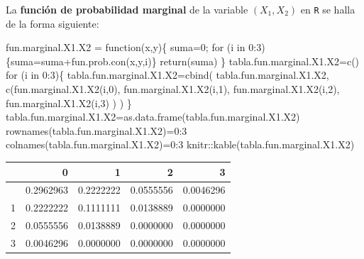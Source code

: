 \documentclass[
  letterpaper,
  DIV=11,
  numbers=noendperiod]{scrreprt}
\newenvironment{Shaded}{\begin{snugshade}}{\end{snugshade}}
\newcommand{\ControlFlowTok}[1]{\textcolor[rgb]{0.00,0.23,0.31}{#1}}
\newcommand{\DecValTok}[1]{\textcolor[rgb]{0.68,0.00,0.00}{#1}}
\newcommand{\FunctionTok}[1]{\textcolor[rgb]{0.28,0.35,0.67}{#1}}
\newcommand{\NormalTok}[1]{\textcolor[rgb]{0.00,0.23,0.31}{#1}}
\newcommand{\OtherTok}[1]{\textcolor[rgb]{0.00,0.23,0.31}{#1}}
\newcommand{\SpecialCharTok}[1]{\textcolor[rgb]{0.37,0.37,0.37}{#1}}
\begin{document}
La \textbf{función de probabilidad marginal} de la variable
\((X_1,X_2)\) en \texttt{R} se halla de la forma siguiente:

\begin{Shaded}
\begin{Highlighting}[]
\NormalTok{fun.marginal.X1.X2 }\OtherTok{=} \ControlFlowTok{function}\NormalTok{(x,y)\{}
\NormalTok{  suma}\OtherTok{=}\DecValTok{0}\NormalTok{;}
  \ControlFlowTok{for}\NormalTok{ (i }\ControlFlowTok{in} \DecValTok{0}\SpecialCharTok{:}\DecValTok{3}\NormalTok{)\{suma}\OtherTok{=}\NormalTok{suma}\SpecialCharTok{+}\FunctionTok{fun.prob.con}\NormalTok{(x,y,i)\}}
  \FunctionTok{return}\NormalTok{(suma)}
\NormalTok{\}}
\NormalTok{tabla.fun.marginal.X1.X2}\OtherTok{=}\FunctionTok{c}\NormalTok{()}
\ControlFlowTok{for}\NormalTok{ (i }\ControlFlowTok{in} \DecValTok{0}\SpecialCharTok{:}\DecValTok{3}\NormalTok{)\{}
\NormalTok{  tabla.fun.marginal.X1.X2}\OtherTok{=}\FunctionTok{cbind}\NormalTok{(}
\NormalTok{    tabla.fun.marginal.X1.X2,}
    \FunctionTok{c}\NormalTok{(}\FunctionTok{fun.marginal.X1.X2}\NormalTok{(i,}\DecValTok{0}\NormalTok{),                                                            }\FunctionTok{fun.marginal.X1.X2}\NormalTok{(i,}\DecValTok{1}\NormalTok{),                                                            }\FunctionTok{fun.marginal.X1.X2}\NormalTok{(i,}\DecValTok{2}\NormalTok{),                                                            }\FunctionTok{fun.marginal.X1.X2}\NormalTok{(i,}\DecValTok{3}\NormalTok{)}
\NormalTok{    )}
\NormalTok{  )}
\NormalTok{  \}}
\NormalTok{tabla.fun.marginal.X1.X2}\OtherTok{=}\FunctionTok{as.data.frame}\NormalTok{(tabla.fun.marginal.X1.X2)}
\FunctionTok{rownames}\NormalTok{(tabla.fun.marginal.X1.X2)}\OtherTok{=}\DecValTok{0}\SpecialCharTok{:}\DecValTok{3}
\FunctionTok{colnames}\NormalTok{(tabla.fun.marginal.X1.X2)}\OtherTok{=}\DecValTok{0}\SpecialCharTok{:}\DecValTok{3}
\NormalTok{knitr}\SpecialCharTok{::}\FunctionTok{kable}\NormalTok{(tabla.fun.marginal.X1.X2)}
\end{Highlighting}
\end{Shaded}

\begin{longtable}[]{@{}lrrrr@{}}
\toprule\noalign{}
& 0 & 1 & 2 & 3 \\
\midrule\noalign{}
\endhead
\bottomrule\noalign{}
\endlastfoot
0 & 0.2962963 & 0.2222222 & 0.0555556 & 0.0046296 \\
1 & 0.2222222 & 0.1111111 & 0.0138889 & 0.0000000 \\
2 & 0.0555556 & 0.0138889 & 0.0000000 & 0.0000000 \\
3 & 0.0046296 & 0.0000000 & 0.0000000 & 0.0000000 \\
\end{longtable}
\end{document}
